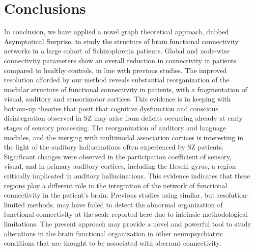 \section{Conclusions}
In conclusion, we have applied a novel graph theoretical approach, dubbed Asymptotical Surprise, to study the structure of brain functional connectivity networks in a large cohort of Schizophrenia patients.
Global and node-wise connectivity parameters show an overall reduction in connectivity in patients compared to healthy controls, in line with previous studies.
The improved resolution afforded by our method reveals substantial reorganization of the modular structure of functional connectivity in patients, with a fragmentation of visual, auditory and sensorimotor cortices.
This evidence is in keeping with bottom-up theories that posit that cognitive dysfunction and conscious disintegration observed in SZ may arise from deficits occurring already at early stages of sensory processing.
The reorganization of auditory and language modules, and the merging with multimodal association cortices is interesting in the light of the auditory hallucinations often experienced by SZ patients.
Significant changes were observed in the participation coefficient of sensory, visual, and in primary auditory cortices, including the Heschl gyrus, a region critically implicated in auditory hallucinations.
This evidence indicates that these regions play a different role in the integration of the network of functional connectivity in the patient's brain.
Previous studies using similar, but resolution-limited methods, may have failed to detect the abnormal organization of functional connectivity at the scale reported here due to intrinsic methodological limitations.
The present approach may provide a novel and powerful tool to study alterations in the brain functional organization in other neuropsychiatric conditions that are thought to be associated with aberrant connectivity.


